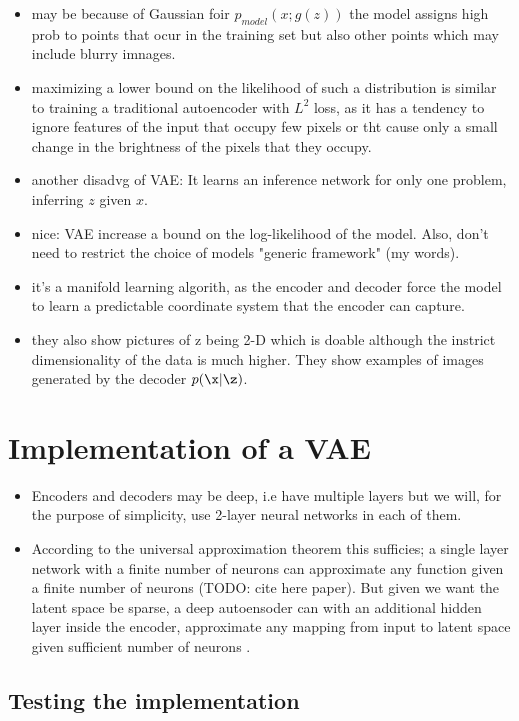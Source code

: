 \begin{itemize}
    \item may be because of Gaussian foir $p_{model}(x;g(z))$ the model assigns high prob to points that ocur in the training set but also other points which may include blurry imnages.
    \item maximizing a lower bound on the likelihood of such a distribution is similar to training a traditional autoencoder with $L^2$ loss, as it has a tendency to ignore features of the input that occupy few pixels or tht cause only a small change in the brightness of the pixels that they occupy.
    \item another disadvg of VAE: It learns an inference network for only one problem, inferring $z$ given $x$. 
    \item nice: VAE increase a bound on the log-likelihood of the model. Also, don't need to restrict the choice of models "generic framework" (my words).
    \item it's a manifold learning algorith, as the encoder and decoder force the model to learn a predictable coordinate system that the encoder can capture.
    \item they also show pictures of z being 2-D which is doable although the instrict dimensionality of the data is much higher. They show examples of images generated by the decoder $p(\x | \z)$.
\end{itemize}

\section{Implementation of a VAE}
\begin{itemize}
    \item Encoders and decoders may be deep, i.e have multiple layers but we will, for the purpose of simplicity, use  2-layer neural networks in each of them. 
    \item According to the universal approximation theorem  this sufficies; a single layer network with a finite number of neurons can approximate any function given a finite number of neurons (TODO: cite here paper). But given we want the latent space be sparse, a deep autoensoder can with an additional hidden layer inside the encoder, approximate any mapping from input to latent space given sufficient number of neurons \cite[Chp.~14]{Goodfellow-et-al-2016}.
\end{itemize}

\subsection{Testing the implementation}

